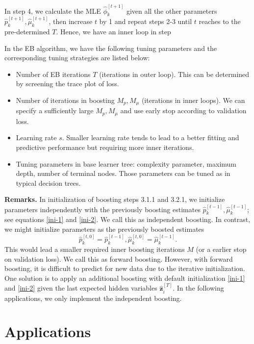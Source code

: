 \documentclass[11pt]{article}
\numberwithin{equation}{section}
\def\bx{\boldsymbol{x}}
\def\bz{\boldsymbol{z}}
\begin{document}
In step 4, 
we calculate the MLE $\hat{\phi}_k^{[t+1]}$ given all the other parameters $\hat{p}_k^{[t+1]}, \hat{\mu}_k^{[t+1]}$, then increase $t$ by 1 and repeat steps 2-3 until $t$ reaches to the pre-determined $T$. Hence, we have an inner loop in step 

		
In the EB algorithm, we have the following tuning parameters and the corresponding tuning strategies are listed below:
	\begin{itemize}
		\item Number of EB iterations {$T$} (iterations in outer loop). This can be determined by screening the trace plot of loss.
		\item Number of iterations in boosting {$M_p,M_\mu$} (iterations in inner loops). We can specify a sufficiently large $M_p,M_\mu$ and use  early stop according to validation loss.
		\item Learning rate {$s$}. Smaller learning rate tends to lead to a better fitting and predictive performance but requiring more inner iterations.
		\item Tuning parameters in base learner tree: complexity parameter, maximum depth, number of terminal nodes. Those parameters can be tuned as in typical decision trees.
	\end{itemize}

		
{\bf Remarks.}
	In initialization of boosting steps 3.1.1 and 3.2.1, we initialize parameters {independently} with the previously boosting estimates $\hat{p}_k^{[t-1]}, \hat{\mu}_k^{[t-1]}$; see equations \eqref{ini-1} and \eqref{ini-2}. We call this as independent boosting.
	In contrast, we might initialize parameters as the previously boosted estimates $$\hat{p}_k^{[t,0]}=\hat{p}_k^{[t-1]}, \hat{\mu}_k^{[t,0]}=\hat{\mu}_k^{[t-1]}.$$
		This would lead a {smaller} required inner boosting iterations $M$ (or a {earlier} stop on validation loss). 
	We call this as forward boosting. 
	However, with forward boosting, it is difficult to predict for new data due to the {iterative initialization}. One solution is to apply an additional boosting with default initialization \eqref{ini-1} and \eqref{ini-2} given the {last expected hidden variables $\hat{\bz}_i^{[T]}$}. In the following applications, we only implement the independent boosting.
			
\section{Applications}\label{sec:application}
\end{document}

